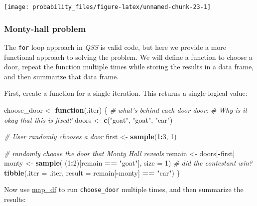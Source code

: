 \documentclass[]{book}
\newenvironment{Shaded}{\begin{snugshade}}{\end{snugshade}}
\newcommand{\KeywordTok}[1]{\textcolor[rgb]{0.13,0.29,0.53}{\textbf{#1}}}
\newcommand{\DataTypeTok}[1]{\textcolor[rgb]{0.13,0.29,0.53}{#1}}
\newcommand{\DecValTok}[1]{\textcolor[rgb]{0.00,0.00,0.81}{#1}}
\newcommand{\StringTok}[1]{\textcolor[rgb]{0.31,0.60,0.02}{#1}}
\newcommand{\CommentTok}[1]{\textcolor[rgb]{0.56,0.35,0.01}{\textit{#1}}}
\newcommand{\ControlFlowTok}[1]{\textcolor[rgb]{0.13,0.29,0.53}{\textbf{#1}}}
\newcommand{\OperatorTok}[1]{\textcolor[rgb]{0.81,0.36,0.00}{\textbf{#1}}}
\newcommand{\NormalTok}[1]{#1}
\theoremstyle{definition}
\theoremstyle{definition}
\theoremstyle{definition}
\theoremstyle{remark}
\begin{document}
\begin{center}\texttt{[image: probability\_files/figure-latex/unnamed-chunk-23-1]} \end{center}

\subsubsection{Monty-hall problem}\label{monty-hall-problem}

The \texttt{for} loop approach in \emph{QSS} is valid code, but here we
provide a more functional approach to solving the problem. We will
define a function to choose a door, repeat the function multiple times
while storing the results in a data frame, and then summarize that data
frame.

First, create a function for a single iteration. This returns a single
logical value:

\begin{Shaded}
\begin{Highlighting}[]
\NormalTok{choose_door <-}\StringTok{ }\ControlFlowTok{function}\NormalTok{(.iter) \{}
  \CommentTok{# what's behind each door door:}
  \CommentTok{# Why is it okay that this is fixed?}
\NormalTok{  doors <-}\StringTok{ }\KeywordTok{c}\NormalTok{(}\StringTok{"goat"}\NormalTok{, }\StringTok{"goat"}\NormalTok{, }\StringTok{"car"}\NormalTok{)}

  \CommentTok{# User randomly chooses a door}
\NormalTok{  first <-}\StringTok{ }\KeywordTok{sample}\NormalTok{(}\DecValTok{1}\OperatorTok{:}\DecValTok{3}\NormalTok{, }\DecValTok{1}\NormalTok{)}

  \CommentTok{# randomly choose the door that Monty Hall reveals}
\NormalTok{  remain <-}\StringTok{ }\NormalTok{doors[}\OperatorTok{-}\NormalTok{first]}
\NormalTok{  monty <-}\StringTok{ }\KeywordTok{sample}\NormalTok{( (}\DecValTok{1}\OperatorTok{:}\DecValTok{2}\NormalTok{)[remain }\OperatorTok{==}\StringTok{ "goat"}\NormalTok{], }\DataTypeTok{size =} \DecValTok{1}\NormalTok{)}
  \CommentTok{# did the contestant win?}
  \KeywordTok{tibble}\NormalTok{(}\DataTypeTok{.iter =}\NormalTok{ .iter,}
         \DataTypeTok{result =}\NormalTok{ remain[}\OperatorTok{-}\NormalTok{monty] }\OperatorTok{==}\StringTok{ "car"}\NormalTok{)}
\NormalTok{\}}
\end{Highlighting}
\end{Shaded}

Now use
\href{https://www.rdocumentation.org/packages/purrr/topics/map_df}{map\_df}
to run \texttt{choose\_door} multiple times, and then summarize the
results:
\end{document}
